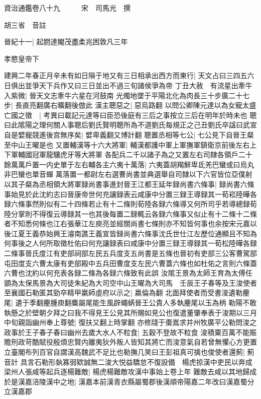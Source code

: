資治通鑑卷八十九　　　宋　司馬光　撰

胡三省　音註

晉紀十一|{
	起閼達閹茂盡柔兆困敦凡三年}


孝愍皇帝下

建興二年春正月辛未有如日隕于地又有三日相承出西方而東行|{
	天文占曰三四五六日俱出並爭天下兵作又曰三日並出不過三旬諸侯爭為帝}
丁丑大赦　有流星出牽牛入紫微|{
	晉天文志牽牛六星在河鼓南}
光燭地墜于平陽北化為肉長三十步廣二十七步|{
	長直亮翻廣右曠翻後倣此}
漢主聰惡之|{
	惡烏路翻}
以問公卿陳元達以為女寵太盛亡國之徵　|{
	考異曰載記元達等曰臣恐後庭有三后之事按立三后在明年於時未也}
聰曰此隂陽之理何關人事聰后劉氏賢明聰所為不道劉氏每規正之己丑劉氏卒諡曰武宣自是嬖寵競進後宫無序矣|{
	嬖卑義翻又博計翻}
聰置丞相等七公|{
	七公見下自晉王粲至中山王曜是也}
又置輔漢等十六大將軍|{
	輔漢都護中軍上軍撫軍鎮衛京前後左右上下軍輔國冠軍龍驤虎牙等大將軍}
各配兵二千以諸子為之又置左右司隸各領戶二十餘萬萬戶置一内史單于左右輔各主六夷十萬落|{
	六夷蓋胡羯鮮卑氐羌巴蠻或曰烏丸非巴蠻也單音蟬}
萬落置一都尉左右選曹尚書並典選舉自司隸以下六官皆位亞僕射以其子粲為丞相領大將軍録尚書事進封晉王江都王延年録尚書六條事|{
	録尚書六條事始見於此沈約志曰晉康帝世何充讓録表云咸康中分置三録王導録其一荀崧陸曄各録六條事然則似有二十四條若止有十二條則荀陸各録六條導又何所司乎若導總録荀陸分掌則不得復云導録其一也其後每置二録輒云各録六條事又似止有十二條十二條者不知悉何條也江右張華江左庾亮並經關尚書七條則亦不知皆何事也余按宋元嘉以後江夏王義恭始興王濬南譙王義宣皆録尚書六條事沈氏世仕江左歷位通顯且不知為何事後之人何所取徵杜佑曰何充讓録表曰咸康中分置三録王導録其一荀松陸曄各録二條事晉氏度江有吏部祠部左民五兵度支五尚書是五條也晉初有吏部三公客曹駕部屯田度支六曹太康有吏部殿中五兵田曹度支左民六曹蓋六條也如杜佑之言則六條蓋六曹也沈約以何充表各録二條為各録六條致有此誤}
汝隂王景為太師王育為太傅任顗為太保馬景為大司徒朱紀為大司空中山王曜為大司馬　壬辰王子春等及王浚使者至襄國石勒匿其勁卒精甲羸師虛府以示之|{
	羸倫為翻}
北面拜使者而受書浚遺勒麈尾|{
	遺于季翻麈腫庾翻麋屬尾能生風辟蠅蜹晉王公貴人多執麈尾以玉為柄}
勒陽不敢執懸之於壁朝夕拜之曰我不得見王公見其所賜如見公也復遣董肇奉表于浚期以三月中旬親詣幽州奉上尊號|{
	復扶又翻上時掌翻}
亦修牋于棗嵩求并州牧廣平公勒問浚之政事於王子春子春曰幽州去歲大水人不粒食|{
	五穀不登故不粒食}
浚積粟百萬不能賑贍刑政苛酷賦役殷煩忠賢内離夷狄外叛人皆知其將亡而浚意氣自若曾無懼心方更置立臺閣布列百官自謂漢高魏武不足比也勒撫几笑曰王彭祖真可擒也俊使者還薊|{
	薊音計}
具言石勒形埶寡弱欵誠無二浚大悦益驕怠不復設備　楊虎掠漢中吏民以奔成梁州人張咸等起兵逐楊難敵|{
	楊虎楊難敵攻漢中事始上卷上年}
難敵去咸以其地歸成於是漢嘉涪陵漢中之地|{
	漢嘉本前漢青衣縣屬蜀郡後漢順帝陽嘉二年改曰漢嘉蜀分立漢嘉郡}
